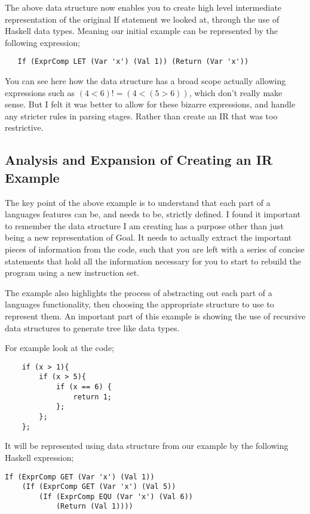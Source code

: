 The above data structure now enables you to create high level intermediate representation of the original If statement we looked at, through the use of Haskell data types. Meaning our initial example can be represented by the following expression;

\begin{lstlisting}
   If (ExprComp LET (Var 'x') (Val 1)) (Return (Var 'x'))
\end{lstlisting} 

You can see here how the data structure has a broad scope actually allowing expressions such as $(4<6) != (4 < (5>6))$, which don't really make sense. But I felt it was better to allow for these bizarre expressions, and handle any stricter rules in parsing stages. Rather than create an IR that was too restrictive.

\subsection{Analysis and Expansion of Creating an IR Example}

The key point of the above example is to understand that each part of a languages features can be, and needs to be, strictly defined. I found it important to remember the data structure I am creating  has a purpose other than just being a new representation of Goal. It needs to actually extract the important pieces of information from the code, such that you are left with a series of concise statements that hold all the information necessary for you to start to rebuild the program using a new instruction set.

The example also highlights the process of abstracting out each part of a languages functionality, then choosing the appropriate structure to use to represent them. An important part of this example is showing the use of recursive data structures to generate tree like data types.

For example look at the code;

\begin{lstlisting}
	if (x > 1){
		if (x > 5){
		 	if (x == 6) {
		 		return 1;
		 	};	
		};
	};
\end{lstlisting}  
 
It will be represented using data structure from our example by the following Haskell expression;

\begin{lstlisting}
If (ExprComp GET (Var 'x') (Val 1)) 
	(If (ExprComp GET (Var 'x') (Val 5))
		(If (ExprComp EQU (Var 'x') (Val 6))
			(Return (Val 1)))) 
\end{lstlisting} 

